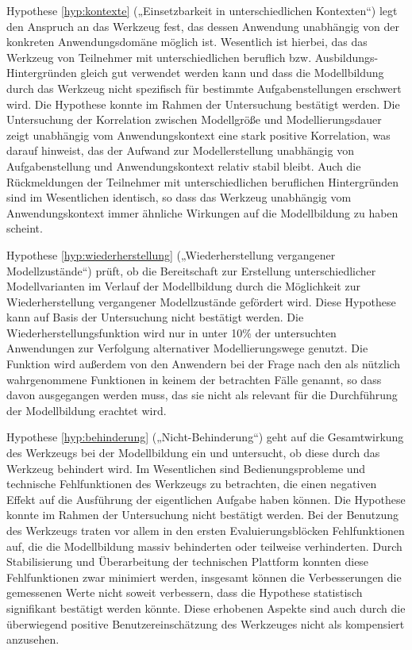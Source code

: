 Hypothese \ref{hyp:kontexte} („Einsetzbarkeit in unterschiedlichen Kontexten“) legt den Anspruch an das Werkzeug fest, das dessen Anwendung unabhängig von der konkreten Anwendungsdomäne möglich ist. Wesentlich ist hierbei, das das Werkzeug von Teilnehmer mit unterschiedlichen beruflich bzw. Ausbildungs-Hintergründen gleich gut verwendet werden kann und dass die Modellbildung durch das Werkzeug nicht spezifisch für bestimmte Aufgabenstellungen erschwert wird. Die Hypothese konnte im Rahmen der Untersuchung bestätigt werden. Die Untersuchung der Korrelation zwischen Modellgröße und Modellierungsdauer zeigt unabhängig vom Anwendungskontext eine stark positive Korrelation, was darauf hinweist, das der Aufwand zur Modellerstellung unabhängig von Aufgabenstellung und Anwendungskontext relativ stabil bleibt. Auch die Rückmeldungen der Teilnehmer mit unterschiedlichen beruflichen Hintergründen sind im Wesentlichen identisch, so dass das Werkzeug unabhängig vom Anwendungskontext immer ähnliche Wirkungen auf die Modellbildung zu haben scheint. 

Hypothese \ref{hyp:wiederherstellung} („Wiederherstellung vergangener Modellzustände“) prüft, ob die Bereitschaft zur Erstellung unterschiedlicher Modellvarianten im Verlauf der Modellbildung durch die Möglichkeit zur Wiederherstellung vergangener Modellzustände gefördert wird. Diese Hypothese kann auf Basis der Untersuchung nicht bestätigt werden. Die Wiederherstellungsfunktion wird nur in unter 10\% der untersuchten Anwendungen zur Verfolgung alternativer Modellierungswege genutzt. Die Funktion wird außerdem von den Anwendern bei der Frage nach den als nützlich wahrgenommene Funktionen in keinem der betrachten Fälle genannt, so dass davon ausgegangen werden muss, das sie nicht als relevant für die Durchführung der Modellbildung erachtet wird.

Hypothese \ref{hyp:behinderung} („Nicht-Behinderung“) geht auf die Gesamtwirkung des Werkzeugs bei der Modellbildung ein und untersucht, ob diese durch das Werkzeug behindert wird. Im Wesentlichen sind Bedienungsprobleme und technische Fehlfunktionen des Werkzeugs zu betrachten, die einen negativen Effekt auf die Ausführung der eigentlichen Aufgabe haben können. Die Hypothese konnte im Rahmen der Untersuchung nicht bestätigt werden. Bei der Benutzung des Werkzeugs traten vor allem in den ersten Evaluierungsblöcken Fehlfunktionen auf, die die Modellbildung massiv behinderten oder teilweise verhinderten. Durch Stabilisierung und Überarbeitung der technischen Plattform konnten diese Fehlfunktionen zwar minimiert werden, insgesamt können die Verbesserungen die gemessenen Werte nicht soweit verbessern, dass die Hypothese statistisch signifikant bestätigt werden könnte. Diese erhobenen Aspekte sind auch durch die überwiegend positive Benutzereinschätzung des Werkzeuges nicht als kompensiert anzusehen.

